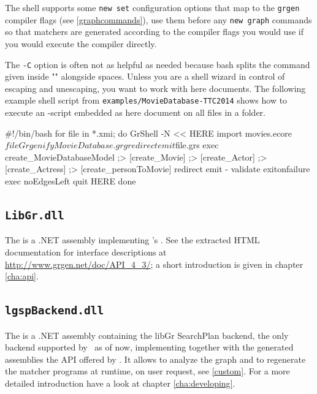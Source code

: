 \begin{note}
The shell supports some \texttt{new set} configuration options that map to the \texttt{grgen} compiler flags (see \ref{graphcommands}), use them before any \texttt{new graph} commands so that matchers are generated according to the compiler flags you would use if you would execute the compiler directly.
\end{note}

\begin{example}
The \texttt{-C} option is often not as helpful as needed because bash splits the command given inside "" alongside spaces.
Unless you are a shell wizard in control of escaping and unescaping, you want to work with here documents.
The following example shell script from \texttt{examples/MovieDatabase-TTC2014} shows how to execute an \GrShell-script embedded as here document on all files in a folder.
\begin{grshell}
#!/bin/bash
for file in *.xmi; do	
    GrShell -N << HERE
import movies.ecore $file GrgenifyMovieDatabase.grg
redirect emit $file.grs
exec create_MovieDatabaseModel ;> [create_Movie] ;> [create_Actor] ;> [create_Actress] ;> [create_personToMovie]
redirect emit - 
validate exitonfailure exec noEdgesLeft
quit
HERE
done
\end{grshell}
\end{example}

\subsection{\texttt{LibGr.dll}}
\label{sct:API}
The \LibGr{} is a .NET assembly implementing \GrG's .
See the extracted HTML documentation for interface descriptions at \url{http://www.grgen.net/doc/API_4_3/};
a short introduction is given in chapter \ref{cha:api}.

\subsection{\texttt{lgspBackend.dll}}
The \LGSPBackend{} is a .NET assembly containing the libGr SearchPlan backend, the only backend supported by \GrG~as of now, implementing together with the generated assemblies the API offered by \LibGr.
It allows to analyze the graph and to regenerate the matcher programs at runtime, on user request, see \ref{custom}.
For a more detailed introduction have a look at chapter \ref{cha:developing}.

